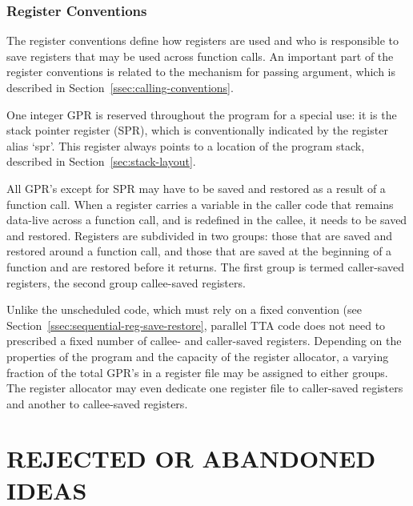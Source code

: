 \documentclass[twoside]{tce}
\begin{document}
\subsection{Register Conventions}
\label{ssec:register-conventions}

The register conventions define how registers are used and who is
responsible to save registers that may be used across function calls.  An
important part of the register conventions is related to the mechanism for
passing argument, which is described in
Section~\ref{ssec:calling-conventions}.

One integer GPR is reserved throughout the program for a special use: it is
the stack pointer register (SPR), which is conventionally indicated by the
register alias `spr'.  This register always points to a location of the
program stack, described in Section~\ref{sec:stack-layout}.

All GPR's except for SPR may have to be saved and restored as a result of a
function call.  When a register carries a variable in the caller code that
remains data-live across a function call, and is redefined in the callee, it
needs to be saved and restored.  Registers are subdivided in two groups:
those that are saved and restored around a function call, and those that are
saved at the beginning of a function and are restored before it returns.
The first group is termed caller-saved registers, the second group
callee-saved registers.

Unlike the unscheduled code, which must rely on a fixed convention (see
Section~\ref{ssec:sequential-reg-save-restore}, parallel TTA code does not
need to prescribed a fixed number of callee- and caller-saved registers.
Depending on the properties of the program and the capacity of the register
allocator, a varying fraction of the total GPR's in a register file may be
assigned to either groups.  The register allocator may even dedicate one
register file to caller-saved registers and another to callee-saved
registers.

\chapter{REJECTED OR ABANDONED IDEAS}
\end{document}
